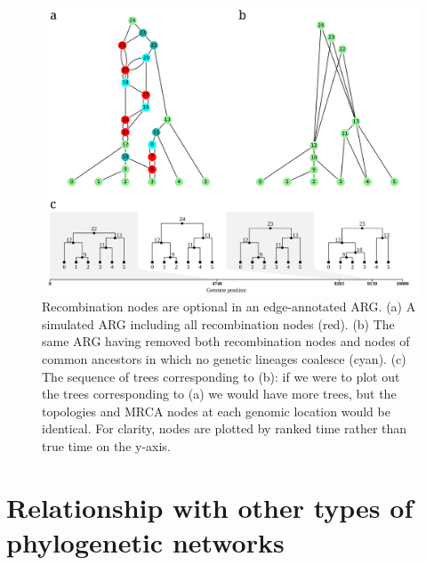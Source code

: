 \documentclass{article}
\begin{document}
\begin{figure}
\centering
\vspace{5em}
\includegraphics[width=\linewidth]{illustrations/ARG_recomb_node_deletion}
\caption{\label{fig-recombinati on-nodes}
Recombination nodes are optional in an edge-annotated ARG. (a) A simulated
ARG including all recombination nodes (red). (b) The same ARG having removed both
recombination nodes and nodes of common ancestors in which no genetic
lineages coalesce (cyan). (c) The sequence of trees corresponding to (b): if we were
to plot out the trees corresponding to (a) we would have more trees, but the topologies
and MRCA nodes at each genomic location would be identical. For clarity, nodes are
plotted by ranked time rather than true time on the y-axis.
}
\end{figure}

\section*{Relationship with other types of phylogenetic networks}
\end{document}
